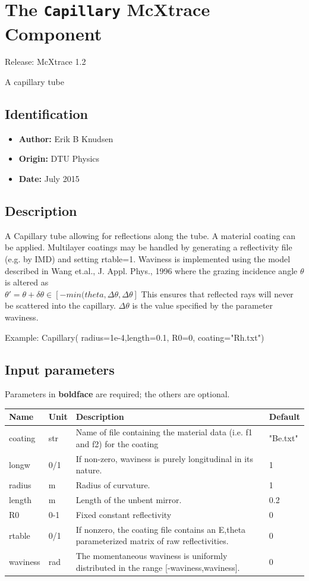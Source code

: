 \section{The \texttt{Capillary} McXtrace Component}
Release: McXtrace 1.2

A capillary tube

\subsection*{Identification}
\begin{itemize}
  \item \textbf{Author:} Erik B Knudsen
  \item \textbf{Origin:} DTU Physics
  \item \textbf{Date:} July 2015
\end{itemize}

\subsection*{Description}
A Capillary tube allowing for reflections along the tube. A material coating can be applied. Multilayer coatings may be handled by generating a reflectivity file (e.g. by IMD) and setting rtable=1. Waviness is implemented using the model described in Wang et.al., J. Appl. Phys., 1996 where the grazing incidence angle $\theta$ is altered as \\ $\theta' = \theta + \delta \theta \in [-min(theta,\Delta\theta,\Delta\theta]$ This ensures that reflected rays will never be scattered into the capillary. $\Delta\theta$ is the value specified by the parameter waviness.

Example: Capillary( radius=1e-4,length=0.1, R0=0, coating="Rh.txt")

\subsection*{Input parameters}
Parameters in \textbf{boldface} are required; the others are optional.

\begin{longtable}{p{}p{}p{}p{}}
\toprule
\textbf{Name} & \textbf{Unit} & \textbf{Description} & \textbf{Default} \\
\midrule
\endhead
coating & str & Name of file containing the material data (i.e. f1 and f2) for the coating & "Be.txt" \\
longw & 0/1 & If non-zero, waviness is purely longitudinal in its nature. & 1 \\
radius & m & Radius of curvature. & 1 \\
length & m & Length of the unbent mirror. & 0.2 \\
R0 & 0-1 & Fixed constant reflectivity & 0 \\
rtable & 0/1 & If nonzero, the coating file contains an E,theta parameterized matrix of raw reflectivities. & 0 \\
waviness & rad & The momentaneous waviness is uniformly distributed in the range [-waviness,waviness]. & 0 \\
\bottomrule
\end{longtable}

